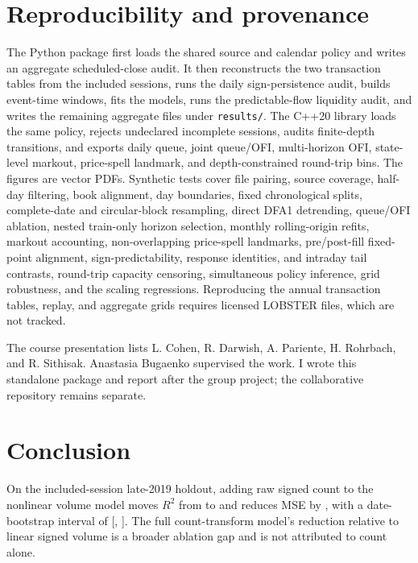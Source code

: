 \documentclass[11pt,a4paper]{article}
\newcommand{\Rtwo}{\ensuremath{R^2}}
\begin{document}
\section{Reproducibility and provenance}

The Python package first loads the shared source and calendar policy and writes
an aggregate scheduled-close audit. It then reconstructs the two transaction
tables from the included sessions, runs the daily sign-persistence audit,
builds event-time windows, fits the models, runs the predictable-flow liquidity
audit, and writes the remaining aggregate files under \texttt{results/}. The C++20
library loads the same policy, rejects undeclared incomplete sessions, audits
finite-depth transitions, and exports daily queue, joint queue/OFI,
multi-horizon OFI, state-level markout, price-spell landmark, and
depth-constrained round-trip bins. The figures are vector PDFs. Synthetic tests
cover file pairing, source coverage, half-day filtering, book alignment, day
boundaries, fixed chronological splits, complete-date and circular-block
resampling, direct DFA1 detrending, queue/OFI ablation, nested train-only
horizon selection, monthly rolling-origin refits, markout accounting,
non-overlapping price-spell landmarks, pre/post-fill fixed-point alignment,
sign-predictability, response identities, and intraday tail contrasts,
round-trip capacity censoring,
simultaneous policy inference, grid robustness, and the scaling regressions.
Reproducing the annual
transaction tables, replay, and aggregate grids requires licensed LOBSTER
files, which are not tracked.

The course presentation lists L. Cohen, R. Darwish, A. Pariente, H. Rohrbach,
and R. Sithisak. Anastasia Bugaenko supervised the work. I wrote this standalone
package and report after the group project; the collaborative repository remains
separate.

\section{Conclusion}
\vspace{0.2em}

On the included-session late-2019 holdout, adding raw signed count to the
nonlinear volume model moves \Rtwo{} from \VolumeRtwo{} to \RawCountRtwo{} and
reduces MSE by \MseReduction{}, with a date-bootstrap interval of
[\BootstrapMseLower{}, \BootstrapMseUpper{}]. The full count-transform model's
\TotalMseReduction{} reduction relative to linear signed volume is a broader
ablation gap and is not attributed to count alone.
\end{document}
